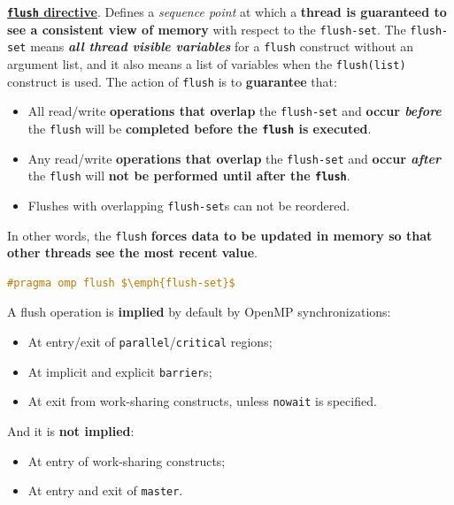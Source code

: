 \highspace
\textbf{\underline{\texttt{flush} directive}}. Defines a \emph{sequence point} at which a \textbf{thread is guaranteed to see a consistent view of memory} with respect to the \texttt{flush-set}. The \texttt{flush-set} means \emph{\textbf{all thread visible variables}} for a \texttt{flush} construct without an argument list, and it also means a list of variables when the \texttt{flush(list)} construct is used. The action of \texttt{flush} is to \textbf{guarantee} that:
\begin{itemize}
	\item All read/write \textbf{operations that overlap} the \texttt{flush-set} and \textbf{occur \emph{before}} the \texttt{flush} will be \textbf{completed before the \texttt{flush} is executed}.
	
	\item Any read/write \textbf{operations that overlap} the \texttt{flush-set} and \textbf{occur \emph{after}} the \texttt{flush} will \textbf{not be performed until after the \texttt{flush}}.
	
	\item Flushes with overlapping \texttt{flush-set}s can not be reordered.
\end{itemize}
\label{openmp: flush}
\hypertarget{openmp: flush}{%
    In other words, the \texttt{flush} \textbf{forces data to be updated in memory so that other threads see the most recent value}.
}
\begin{openmpbox}
	\begin{lstlisting}[language=C++, mathescape=true]
#pragma omp flush $\emph{flush-set}$\end{lstlisting}
\end{openmpbox}

\noindent
A flush operation is \textbf{implied} by default by OpenMP synchronizations:
\begin{itemize}
	\item At entry/exit of \texttt{parallel}/\texttt{critical} regions;
	\item At implicit and explicit \texttt{barrier}s;
	\item At exit from work-sharing constructs, unless \texttt{nowait} is specified.
\end{itemize}
And it is \textbf{not implied}:
\begin{itemize}
	\item At entry of work-sharing constructs;
	\item At entry and exit of \texttt{master}.
\end{itemize}
